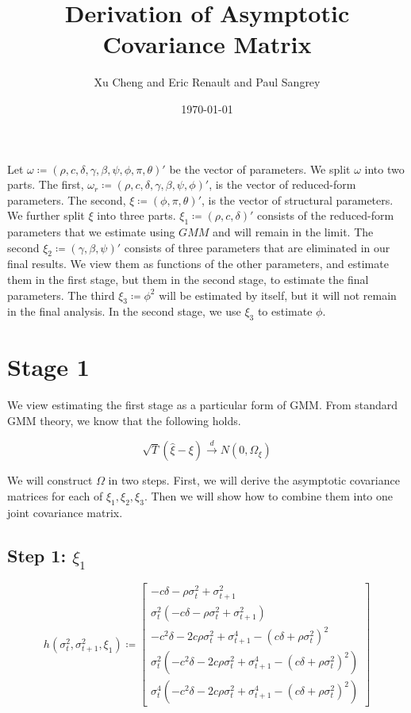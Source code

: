 \documentclass[11pt, letterpaper, twoside, final]{article}
\author{Xu Cheng and Eric Renault and Paul Sangrey}
\title{Derivation of Asymptotic Covariance Matrix}
\date{\today}
\newcommand*{\dto}{\overset{d}{\longrightarrow}}
\begin{document}
\maketitle

Let $\omega \coloneqq (\rho, c, \delta, \gamma, \beta, \psi, \phi, \pi, \theta)'$ be the vector of parameters.
We split $\omega$ into two parts.
The first, $\omega_r \coloneqq (\rho, c, \delta, \gamma, \beta, \psi, \phi)'$, is the vector of reduced-form
parameters.
The second, $\xi \coloneqq (\phi, \pi, \theta)'$, is the vector of structural parameters. 
We further split $\xi$ into three parts. 
$\xi_1 \coloneqq (\rho, c, \delta)'$ consists of the reduced-form parameters that we estimate using $GMM$ and will
remain in the limit.
The second $\xi_2 \coloneqq (\gamma, \beta, \psi)'$ consists of three parameters that are eliminated in our final
results. 
We view them as functions of the other parameters, and estimate them in the first stage, but 
them in the second stage, to estimate the final parameters.
The third $\xi_3 \coloneqq \phi^2$ will be estimated by itself, but it will not remain in the final analysis.
In the second stage, we use $\xi_3$ to estimate $\phi$.

\section{Stage 1}

We view estimating the first stage as a particular form of GMM.
From standard GMM theory, we know that the following holds.

\begin{equation}
    \sqrt{T} (\hat{\xi} - \xi)  \dto N\left(0, \Omega_{\xi}\right)
\end{equation}


We will construct $\Omega$ in two steps.
First, we will derive the asymptotic covariance matrices for each of $\xi_1, \xi_2, \xi_3$.
Then we will show how to combine them into one joint covariance matrix.

\subsection{Step 1: $\xi_1$}

\begin{equation}
    h(\sigma^2_{t},\sigma^2_{t+1}, \xi_1) \coloneqq 
\begin{bmatrix}
    - c \delta - \rho \sigma^2_{t} + \sigma^2_{t+1}\\
%
    \sigma^2_{t} \left(- c \delta - \rho \sigma^2_{t} + \sigma^2_{t+1}\right)\\
%
    - c^{2} \delta - 2 c \rho \sigma^2_{t} + \sigma^4_{t+1} - \left(c \delta + \rho \sigma^2_{t}\right)^{2}\\
%
    \sigma^2_{t} \left(- c^{2} \delta - 2 c \rho \sigma^2_{t} + \sigma^4_{t+1} - \left(c \delta + \rho
    \sigma^2_{t}\right)^{2}\right)\\
%
    \sigma^4_{t} \left(- c^{2} \delta - 2 c \rho \sigma^2_{t} + \sigma^4_{t+1} - \left(c \delta + \rho
    \sigma^2_{t}\right)^{2}\right)
\end{bmatrix}
\end{equation}
\end{document}
